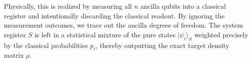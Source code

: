 \documentclass[12pt]{article}
\begin{document}
Physically, this is realized by measuring all $n$ ancilla qubits into a classical register and intentionally discarding the classical readout. By ignoring the measurement outcomes, we trace out the ancilla degrees of freedom. The system register $S$ is left in a statistical mixture of the pure states $|\psi_i\rangle_S$ weighted precisely by the classical probabilities $p_i$, thereby outputting the exact target density matrix $\rho$.
\end{document}
